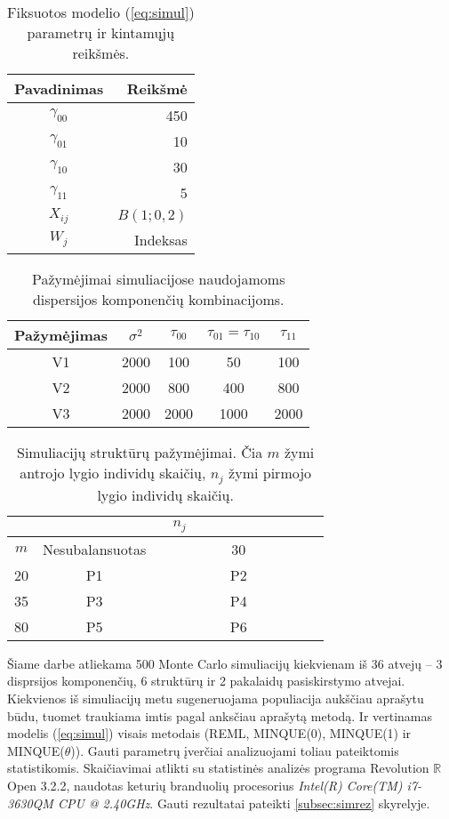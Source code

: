 \documentclass[11pt,a4paper]{article}
\newcommand{\R}{{\mathbb R}}
\begin{document}
\begin{table}[ht]
\centering
\begin{tabular}{|c|r|}
\hline
Pavadinimas & Reikšmė\\
\hline
$\gamma_{00}$& 450  \\
$\gamma_{01}$& 10  \\
$\gamma_{10}$& 30 \\
$\gamma_{11}$& 5  \\
$X_{ij}$ &  $B\left(1; 0,2\right)$ \\
$W_{j}$ &  Indeksas \\
\hline
\end{tabular}
\caption[Fiksuotos modelio (\ref{eq:simul}) parametrų ir kintamųjų reikšmės]{Fiksuotos modelio (\ref{eq:simul}) parametrų ir kintamųjų reikšmės.}
\label{table:fixed}
\end{table}

\begin{table}[ht]
\centering
\begin{tabular}{|c|cccc|}
\hline
 Pažymėjimas & $\sigma^2$&$\tau_{00}$&$\tau_{01}=\tau_{10}$&$\tau_{11}$\\
\hline
V1&2000&100&50&100\\
V2&2000&800&400&800\\
V3&2000&2000&1000&2000\\
\hline
\end{tabular}
\caption[Pažymėjimai simuliacijose naudojamoms dispersijos komponenčių kombinacijoms]{Pažymėjimai simuliacijose naudojamoms dispersijos komponenčių kombinacijoms.}
\label{table:struct2}
\end{table}

\begin{table}[ht]
\centering
\begin{tabular}{|c|cc|}
\hline
 & \multicolumn{2}{c|}{$n_j$}\\
\hline
$m$& Nesubalansuotas & \ \ \ \ \ \ \ \ \ \ 30\ \ \ \ \ \ \ \ \ \ \\
\hline
20& P1&P2\\
35&P3&P4\\
80& P5&P6\\
\hline
\end{tabular}
\caption[Simuliacijų struktūrų pažymėjimai]{Simuliacijų struktūrų pažymėjimai. Čia $m$ žymi antrojo lygio individų skaičių, $n_j$ žymi pirmojo lygio individų skaičių.}
\label{table:struct1}
\end{table}



\indent Šiame darbe atliekama 500 Monte Carlo simuliacijų kiekvienam iš 36 atvejų -- 3 disprsijos komponenčių, 6 struktūrų ir 2 pakalaidų pasiskirstymo atvejai. Kiekvienos iš simuliacijų metu sugeneruojama populiacija aukščiau aprašytu būdu, tuomet traukiama imtis pagal anksčiau aprašytą metodą. Ir vertinamas modelis (\ref{eq:simul}) visais metodais (REML, MINQUE(0), MINQUE(1) ir MINQUE($\theta$)). Gauti parametrų įverčiai analizuojami toliau pateiktomis statistikomis. Skaičiavimai atlikti su statistinės analizės programa Revolution $\R$ Open 3.2.2, naudotas keturių branduolių procesorius \textit{Intel(R) Core(TM) i7-3630QM CPU @ 2.40GHz}. Gauti rezultatai pateikti \ref{subsec:simrez} skyrelyje.
\end{document}
